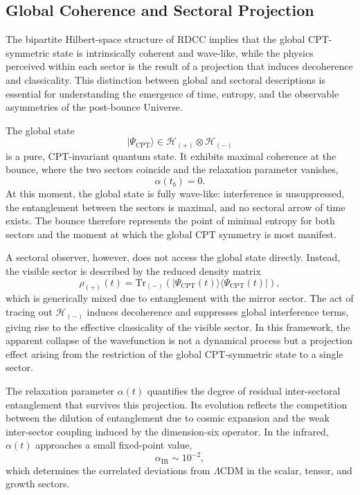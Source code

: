 \documentclass[11pt,a4paper]{article}
\begin{document}
\subsection{Global Coherence and Sectoral Projection}

The bipartite Hilbert-space structure of RDCC implies that the global CPT-symmetric state is
intrinsically coherent and wave-like, while the physics perceived within each sector is the result
of a projection that induces decoherence and classicality. This distinction between global and
sectoral descriptions is essential for understanding the emergence of time, entropy, and the
observable asymmetries of the post-bounce Universe.

The global state
\begin{equation}
    |\Psi_{\mathrm{CPT}}\rangle \in \mathcal{H}_{(+)} \otimes \mathcal{H}_{(-)}
\end{equation}
is a pure, CPT-invariant quantum state. It exhibits maximal coherence at the bounce, where the
two sectors coincide and the relaxation parameter vanishes,
\begin{equation}
    \alpha(t_b) = 0.
\end{equation}
At this moment, the global state is fully wave-like: interference is unsuppressed, the entanglement
between the sectors is maximal, and no sectoral arrow of time exists. The bounce therefore
represents the point of minimal entropy for both sectors and the moment at which the global
CPT symmetry is most manifest.

A sectoral observer, however, does not access the global state directly. Instead, the visible
sector is described by the reduced density matrix
\begin{equation}
    \rho_{(+)}(t) = \mathrm{Tr}_{(-)}\!\left(|\Psi_{\mathrm{CPT}}(t)\rangle
    \langle\Psi_{\mathrm{CPT}}(t)|\right),
\end{equation}
which is generically mixed due to entanglement with the mirror sector. The act of tracing out
$\mathcal{H}_{(-)}$ induces decoherence and suppresses global interference terms, giving rise to the
effective classicality of the visible sector. In this framework, the apparent collapse of the
wavefunction is not a dynamical process but a projection effect arising from the restriction of the
global CPT-symmetric state to a single sector.

The relaxation parameter $\alpha(t)$ quantifies the degree of residual inter-sectoral entanglement
that survives this projection. Its evolution reflects the competition between the dilution of
entanglement due to cosmic expansion and the weak inter-sector coupling induced by the
dimension-six operator. In the infrared, $\alpha(t)$ approaches a small fixed-point value,
\begin{equation}
    \alpha_{\mathrm{IR}} \sim 10^{-2},
\end{equation}
which determines the correlated deviations from $\Lambda$CDM in the scalar, tensor, and growth
sectors.
\end{document}
